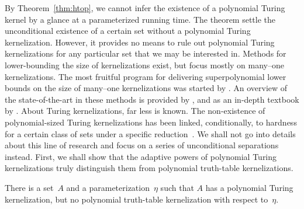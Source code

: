 By Theorem~\ref{thm:htop}, we cannot infer the existence of a polynomial Turing kernel by a glance at a parameterized running time.
The theorem settle the unconditional existence of a certain set without a polynomial Turing kernelization.
However, it provides no means to rule out polynomial Turing kernelizations for any particular set that we may be interested in.
Methods for lower-bounding the size of kernelizations exist, but focus mostly on many--one kernelizations.
The most fruitful program for delivering superpolynomial lower bounds on the size of many--one kernelizations was started by \textcite{bodlaender2009problems}.
An overview of the state-of-the-art in these methods is provided by \textcite{kratsch2014recent}, and as an in-depth textbook by \textcite{fomin2019kernelization}.
About Turing kernelizations, far less is known.
The non-existence of polynomial-sized Turing kernelizations has been linked, conditionally, to hardness for a certain class of sets under a specific reduction~\parencite{hermelin2015completeness}.
We shall not go into details about this line of research and focus on a series of unconditional separations instead.
First, we shall show that the adaptive powers of polynomial Turing kernelizations truly distinguish them from polynomial truth-table kernelizations.
\begin{theorem}
\label{thm:ht}%
  There is a set~$A$ and a parameterization~$\eta$ such that $A$ has a polynomial Turing kernelization, but no polynomial truth-table kernelization with respect to~$\eta$.
\end{theorem}
